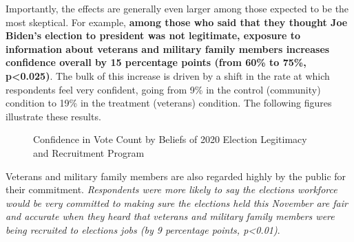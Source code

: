 \documentclass[
  11pt,
  a4paper,
]{article}
\begin{document}
Importantly, the effects are generally even larger among those expected
to be the most skeptical. For example, \textbf{among those who said that
they thought Joe Biden's election to president was not legitimate,
exposure to information about veterans and military family members
increases confidence overall by 15 percentage points (from 60\% to 75\%,
p\textless0.025)}. The bulk of this increase is driven by a shift in the
rate at which respondents feel very confident, going from 9\% in the
control (community) condition to 19\% in the treatment (veterans)
condition. The following figures illustrate these results.

\begin{figure}

\caption{\label{fig-q19-legit}Confidence in Vote Count by Beliefs of
2020 Election Legitimacy and Recruitment Program}


\end{figure}%

Veterans and military family members are also regarded highly by the
public for their commitment. \emph{Respondents were more likely to say
the elections workforce would be very committed to making sure the
elections held this November are fair and accurate when they heard that
veterans and military family members were being recruited to elections
jobs (by 9 percentage points, p\textless0.01)}.
\end{document}
